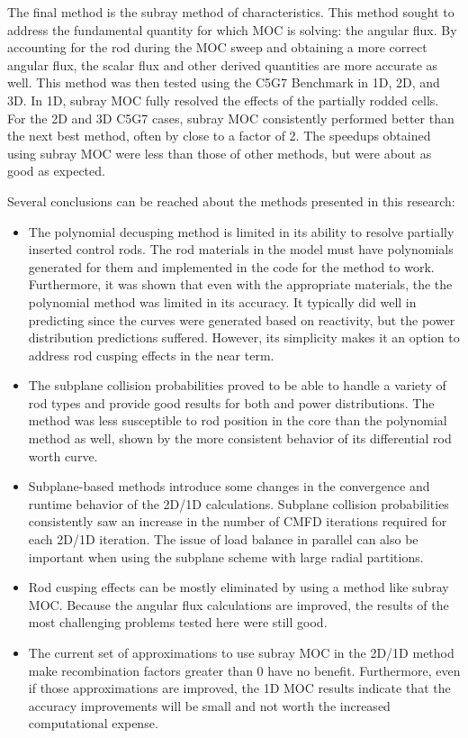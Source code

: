 The final method is the subray method of characteristics.  This method sought to address the fundamental quantity for which MOC is solving: the angular flux.  By accounting for the rod during the MOC sweep and obtaining a more correct angular flux, the scalar flux and other derived quantities are more accurate as well.  This method was then tested using the C5G7 Benchmark in 1D, 2D, and 3D.  In 1D, subray MOC fully resolved the effects of the partially rodded cells.  For the 2D and 3D C5G7 cases, subray MOC consistently performed better than the next best method, often by close to a factor of 2.  The speedups obtained using subray MOC were less than those of other methods, but were about as good as expected.

Several conclusions can be reached about the methods presented in this research:

\begin{itemize}
    \item The polynomial decusping method is limited in its ability to resolve partially inserted control rods.  The rod materials in the model must have polynomials generated for them and implemented in the code for the method to work.  Furthermore, it was shown that even with the appropriate materials, the the polynomial method was limited in its accuracy.  It typically did well in predicting \keff{} since the curves were generated based on reactivity, but the power distribution predictions suffered.  However, its simplicity makes it an option to address rod cusping effects in the near term.
    
    \item The subplane collision probabilities proved to be able to handle a variety of rod types and provide good results for both \keff{} and power distributions.  The method was less susceptible to rod position in the core than the polynomial method as well, shown by the more consistent behavior of its differential rod worth curve.
    
    \item Subplane-based methods introduce some changes in the convergence and runtime behavior of the 2D/1D calculations.  Subplane collision probabilities consistently saw an increase in the number of CMFD iterations required for each 2D/1D iteration.  The issue of load balance in parallel can also be important when using the subplane scheme with large radial partitions.
    
    \item Rod cusping effects can be mostly eliminated by using a method like subray MOC.  Because the angular flux calculations are improved, the results of the most challenging problems tested here were still good.
    
    \item The current set of approximations to use subray MOC in the 2D/1D method make recombination factors greater than 0 have no benefit.  Furthermore, even if those approximations are improved, the 1D MOC results indicate that the accuracy improvements will be small and not worth the increased computational expense.
\end{itemize}


